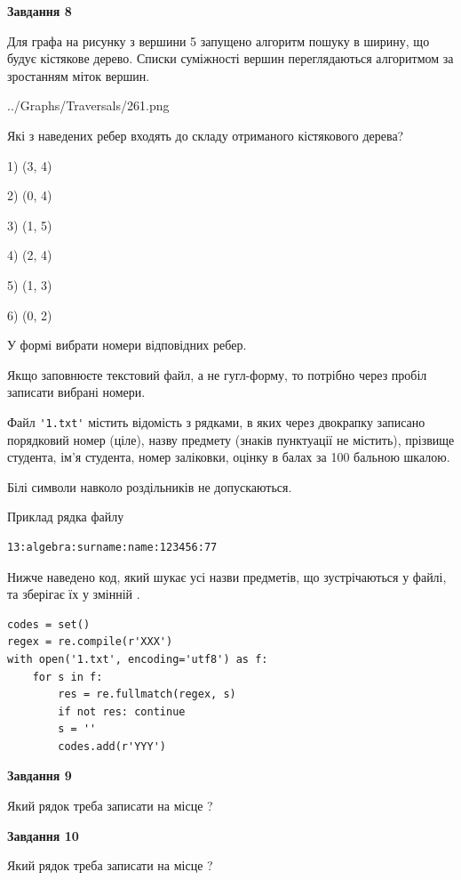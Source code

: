 \documentclass[12pt, ukrainian]{article}
\def\code#1{\Verb!#1!}
\begin{document}
{\begin {large}
{\begin {center}\textbf{Завдання 8}\end {center}}\par
Для графа на рисунку з вершини 5 запущено алгоритм пошуку в ширину, що будує кістякове дерево. Списки суміжності вершин переглядаються алгоритмом за зростанням міток вершин.\par
\begin{center}
	{../Graphs/Traversals/261.png}
\end{center}
\par Які з наведених ребер входять до складу отриманого кістякового дерева?\par
1) (3, 4)\par
2) (0, 4)\par
3) (1, 5)\par
4) (2, 4)\par
5) (1, 3)\par
6) (0, 2)\par
{\vskip 15pt} У формі вибрати номери відповідних ребер.


Якщо заповнюєте текстовий файл, а не гугл-форму, то потрібно через пробіл записа\-ти вибрані номери.\par
\newpage


Файл \code{'1.txt'} містить відомість з рядками, в яких через двокрапку записано поряд\-ковий номер (ціле), назву предмету (знаків пунктуації не містить), прізвище студента, ім'я студента, номер заліковки, оцінку в балах за 100 бальною шкалою.

Білі символи навколо роздільників не допускаються.

Приклад рядка файлу



\begin{verbatim}
13:algebra:surname:name:123456:77
\end{verbatim}


Нижче наведено код, який шукає усі назви предметів, що зустрічаються у файлі, та зберігає їх у змінній .



\begin{verbatim}
codes = set()
regex = re.compile(r'XXX')
with open('1.txt', encoding='utf8') as f:
    for s in f:
        res = re.fullmatch(regex, s)
        if not res: continue
        s = ''
        codes.add(r'YYY')
\end{verbatim}


{\begin {center}\textbf{Завдання 9}\end {center}}\par
Який рядок треба записати на місце  ?\par
\vspace{5mm}


{\begin {center}\textbf{Завдання 10}\end {center}}\par
Який рядок треба записати на місце  ?\par


\newpage


\end {large}}
\end{document}
